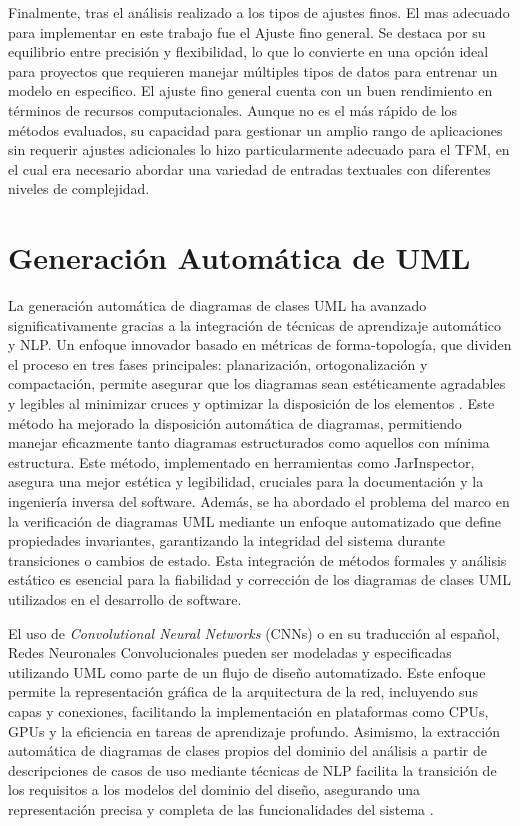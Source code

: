 

Finalmente, tras el análisis realizado a los tipos de ajustes finos. El mas adecuado para implementar en este trabajo fue el Ajuste fino general. Se destaca por su equilibrio entre precisión y flexibilidad, lo que lo convierte en una opción ideal para proyectos que requieren manejar múltiples tipos de datos para entrenar un modelo en especifico. El ajuste fino general cuenta con un buen rendimiento en términos de recursos computacionales. Aunque no es el más rápido de los métodos evaluados, su capacidad para gestionar un amplio rango de aplicaciones sin requerir ajustes adicionales lo hizo particularmente adecuado para el TFM, en el cual era necesario abordar una variedad de entradas textuales con diferentes niveles de complejidad.

\section{Generación Automática de UML}

La generación automática de diagramas de clases UML ha avanzado significativamente gracias a la integración de técnicas de aprendizaje automático y NLP. Un enfoque innovador basado en métricas de forma-topología, que dividen el proceso en tres fases principales: planarización, ortogonalización y compactación, permite asegurar que los diagramas sean estéticamente agradables y legibles al minimizar cruces y optimizar la disposición de los elementos \cite{Eiglsperger2003}. Este método ha mejorado la disposición automática de diagramas, permitiendo manejar eficazmente tanto diagramas estructurados como aquellos con mínima estructura. Este método, implementado en herramientas como JarInspector, asegura una mejor estética y legibilidad, cruciales para la documentación y la ingeniería inversa del software. Además, se ha abordado el problema del marco en la verificación de diagramas UML mediante un enfoque automatizado que define propiedades invariantes, garantizando la integridad del sistema durante transiciones o cambios de estado. Esta integración de métodos formales y análisis estático es esencial para la fiabilidad y corrección de los diagramas de clases UML utilizados en el desarrollo de software.


El uso de \textit{Convolutional Neural Networks} (CNNs) o en su traducción al español, Redes Neuronales Convolucionales pueden ser modeladas y especificadas utilizando UML como parte de un flujo de diseño automatizado. Este enfoque \cite{Suarez2023} permite la representación gráfica de la arquitectura de la red, incluyendo sus capas y conexiones, facilitando la implementación en plataformas como CPUs, GPUs y la eficiencia en tareas de aprendizaje profundo. Asimismo, la extracción automática de diagramas de clases propios del dominio del análisis a partir de descripciones de casos de uso mediante técnicas de NLP facilita la transición de los requisitos a los modelos del dominio del diseño, asegurando una representación precisa y completa de las funcionalidades del sistema \cite{Gosala2021}.

